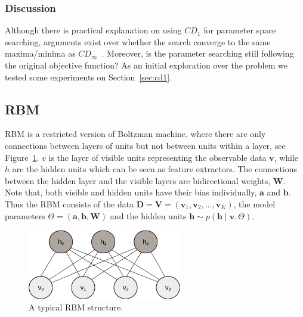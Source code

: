 	\subsubsection{Discussion}
		Although there is practical explanation on using $CD_1$ for parameter space searching, arguments exist over whether the search converge to the same maxima/minima as $CD_\infty$~\cite{wu2015bias}.
		Moreover, is the parameter searching still following the original objective function?	
		As an initial exploration over the problem we tested some experiments on Section~\ref{sec:cd1}. 
\subsection{RBM\cite{zhang2013rbm}}
	RBM is a restricted version of Boltzman machine, where there are only connections between layers of units but not between units within a layer, see Figure~\ref{fig:RBM}.
	$ v $ is the layer of visible units representing the observable data $ \mathbf{v} $, while $ h $ are the hidden units which can be seen as feature extractors.
	The connections between the hidden layer and the visible layers are bidirectional weights, $ \mathbf{W} $.
	Note that, both visible and hidden units have their bias individually, $ \mathbf{a} $ and $ \mathbf{b} $.
	Thus the RBM consists of the data $ \mathbf{D} = \mathbf{V} = (\mathbf{v}_1, \mathbf{v}_2, ..., \mathbf{v}_K ) $, the model parameters $ \Theta = (\mathbf{a}, \mathbf{b}, \mathbf{W}) $ and the hidden units $ \mathbf{h} \sim p(\mathbf{h} \mid \mathbf{v}, \Theta) $.
	\begin{figure}[hbt]
	\centering
		\includegraphics[width=0.6\textwidth]{pics_sdbn/RBM.pdf}
		\caption{A typical RBM structure.}
		\label{fig:RBM}
	\end{figure}
	
